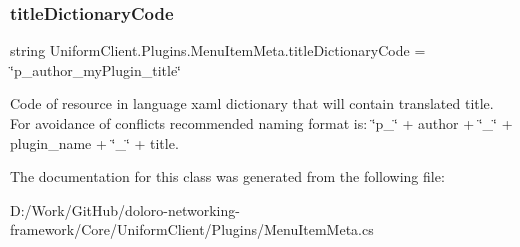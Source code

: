 \subsubsection{\texorpdfstring{title\+Dictionary\+Code}{titleDictionaryCode}}
{\footnotesize\ttfamily string Uniform\+Client.\+Plugins.\+Menu\+Item\+Meta.\+title\+Dictionary\+Code = \char`\"{}p\+\_\+author\+\_\+my\+Plugin\+\_\+title\char`\"{}}



Code of resource in language xaml dictionary that will contain translated title. For avoidance of conflicts recommended naming format is\+: \char`\"{}p\+\_\+\char`\"{} + author + \char`\"{}\+\_\+\char`\"{} + plugin\+\_\+name + \char`\"{}\+\_\+\char`\"{} + title. 



The documentation for this class was generated from the following file\+:\begin{DoxyCompactItemize}
\item 
D\+:/\+Work/\+Git\+Hub/doloro-\/networking-\/framework/\+Core/\+Uniform\+Client/\+Plugins/Menu\+Item\+Meta.\+cs\end{DoxyCompactItemize}
